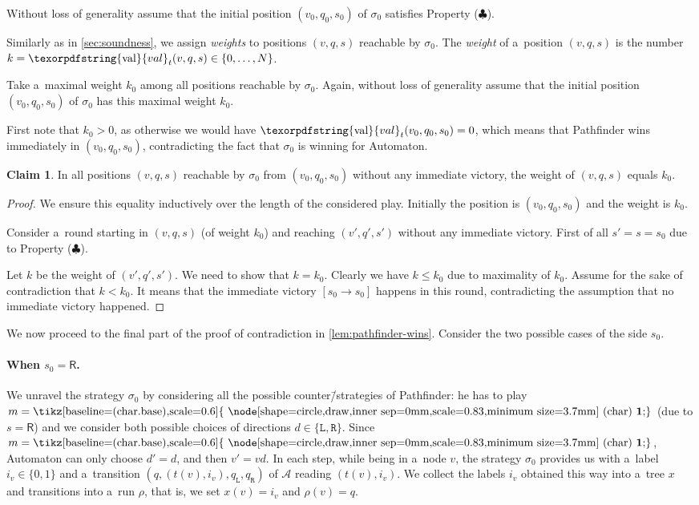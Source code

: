 \documentclass[11pt,a4paper]{amsart}
\theoremstyle{plain}
\theoremstyle{definition}
\newtheorem{clm}[thm]{Claim}
\theoremstyle{defC}
\theoremstyle{thmC}
\theoremstyle{plain}
\numberwithin{equation}{section}
\numberwithin{equation}{section}
\numberwithin{figure}{section}
\newcommand{\ident}[1]{\ensuremath{\texorpdfstring{\mathrm{\mathnm{#1}}}{#1}}\xspace}
\newcommand{\mathcalsym}[1]{\ensuremath{\mathcal{#1}}\xspace}
\newcommand{\CA}{\mathcalsym{A}}
\newcommand{\dL}{\mathtt{{\scriptstyle L}}}
\newcommand{\dR}{\mathtt{{\scriptstyle R}}}
\newcommand{\mathnm}[1]{#1}
\newcommand{\val}{\ident{val}}
\newcommand{\sR}{\mathsf{R}}
\newcommand*\circled[1]{\tikz[baseline=(char.base),scale=0.6]{
            \node[shape=circle,draw,inner sep=0mm,scale=0.83,minimum size=3.7mm] (char) {\textbf{#1}};}}
\newcommand{\fg}{\mathbf{\text{\circled{1}}}}
\newcommand{\imwin}[2]{[#1\to #2]}
\begin{document}
Without loss of generality assume that the initial position $(v_0,q_0,s_0)$ of $\sigma_0$ satisfies Property ($\clubsuit$).

Similarly as in \cref{sec:soundness}, we assign \emph{weights} to positions $(v,q,s)$ reachable by $\sigma_0$.
The \emph{weight} of a~position $(v,q,s)$ is the number $k=\val_t(v,q,s)\in\{0,\ldots,N\}$.

Take a~maximal weight $k_0$ among all positions reachable by $\sigma_0$.
Again, without loss of generality assume that the initial position $(v_0,q_0,s_0)$ of $\sigma_0$ has this maximal weight $k_0$.

First note that $k_0>0$, as otherwise we would have $\val_t(v_0,q_0,s_0)=0$, which means that Pathfinder wins immediately in $(v_0,q_0,s_0)$, contradicting the fact that $\sigma_0$ is winning for Automaton.

\begin{clm}
\label{cl:no-change-weight}
In all positions $(v,q,s)$ reachable by $\sigma_0$ from $(v_0,q_0,s_0)$ without any immediate victory, the weight of $(v,q,s)$ equals $k_0$.
\end{clm}

\begin{proof}
We ensure this equality inductively over the length of the considered play.
Initially the position is $(v_0,q_0,s_0)$ and the weight is $k_0$.

Consider a~round starting in $(v,q,s)$ (of weight $k_0$) and reaching $(v',q',s')$ without any immediate victory.
First of all $s'=s=s_0$ due to Property ($\clubsuit$).

Let $k$ be the weight of $(v',q',s')$.
We need to show that $k=k_0$.
Clearly we have $k\leq k_0$ due to maximality of $k_0$.
Assume for the sake of contradiction that $k<k_0$.
It means that the immediate victory $\imwin{s_0}{s_0}$ happens in this round, contradicting the assumption that no immediate victory happened.
\end{proof}

We now proceed to the final part of the proof of contradiction in \cref{lem:pathfinder-wins}.
Consider the two possible cases of the side $s_0$.


\paragraph*{When $s_0=\sR$.}

We unravel the strategy $\sigma_0$ by considering all the possible counter\=/strategies of Pathfinder:
he has to play $m=\fg$ (due to $s=\sR$) and we consider both possible choices of directions $d\in\{\dL,\dR\}$.
Since $m=\fg$, Automaton can only choose $d'=d$, and then $v'=vd$.
In each step, while being in a~node $v$, the strategy $\sigma_0$ provides us with a~label $i_v\in\{0,1\}$ and a~transition $(q,(t(v),i_v),q_\dL,q_\dR)$ of $\CA$ reading $(t(v),i_v)$.
We collect the labels $i_v$ obtained this way into a~tree $x$ and transitions into a~run $\rho$, that is, we set $x(v)=i_v$ and $\rho(v)=q$.
\end{document}
